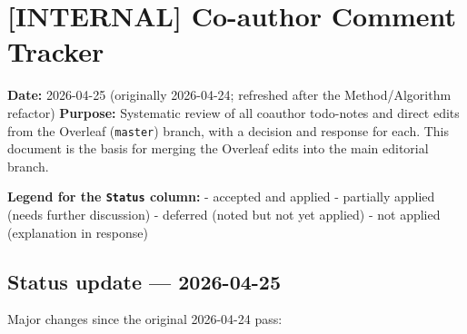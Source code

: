 \section{[INTERNAL] Co-author Comment Tracker}
\label{sec:appendix-internal-tracking}

\providecommand{\tightlist}{\setlength{\itemsep}{0pt}\setlength{\parskip}{0pt}}
\providecommand{\real}[1]{#1}
\providecommand{\pandocbounded}[1]{#1}

\begin{center}
\end{center}

\bigskip

\textbf{Date:} 2026-04-25 (originally 2026-04-24; refreshed after the Method/Algorithm refactor) \textbf{Purpose:} Systematic review of all coauthor todo-notes and direct edits from the Overleaf (\texttt{master}) branch, with a decision and response for each. This document is the basis for merging the Overleaf edits into the main editorial branch.

\textbf{Legend for the \texttt{Status} column:} - {\color{green!60!black}\faCheckCircle} accepted and applied - {\color{blue!60!black}\faSync} partially applied (needs further discussion) - {\color{orange!80!black}\faPauseCircle} deferred (noted but not yet applied) - {\color{red!70!black}\faTimesCircle} not applied (explanation in response)

\subsection{Status update --- 2026-04-25}\label{status-update-2026-04-25}

Major changes since the original 2026-04-24 pass:

